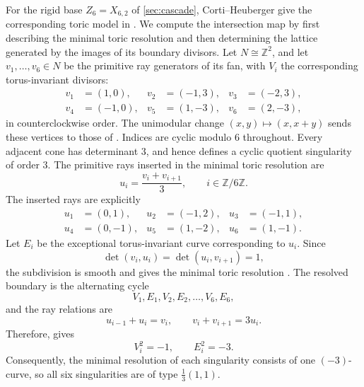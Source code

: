 \documentclass[11pt]{article}
\theoremstyle{plain}
\theoremstyle{definition}
\theoremstyle{remark}
\newcommand{\Z}{\mathbb Z}
\begin{document}
For the rigid base \(Z_6=X_{6,2}\) of \cref{sec:cascade},
Corti--Heuberger give the corresponding toric model in
\cite[Section~2.2.5]{Corti2016}. We compute the intersection map by first
describing the minimal toric resolution and then determining the lattice
generated by the images of its boundary divisors. Let \(N\cong\Z^2\), and let
\(v_1,\dots,v_6\in N\) be the primitive ray generators of its fan, with
\(V_i\) the corresponding torus-invariant divisors:
\[
\begin{aligned}
v_1&=(1,0),&
v_2&=(-1,3),&
v_3&=(-2,3),\\
v_4&=(-1,0),&
v_5&=(1,-3),&
v_6&=(2,-3),
\end{aligned}
\]
in counterclockwise order. The unimodular change
\((x,y)\mapsto(x,x+y)\) sends these vertices to those of
\cite[Figure~1]{Corti2016}. Indices are cyclic modulo \(6\) throughout. Every
adjacent cone has determinant \(3\), and hence defines a cyclic quotient
singularity of order \(3\). The primitive rays inserted in the
minimal toric resolution are
\[
u_i=\frac{v_i+v_{i+1}}3,
\qquad
i\in\Z/6\Z.
\]
The inserted rays are explicitly
\[
\begin{aligned}
u_1&=(0,1),&
u_2&=(-1,2),&
u_3&=(-1,1),\\
u_4&=(0,-1),&
u_5&=(1,-2),&
u_6&=(1,-1).
\end{aligned}
\]
Let \(E_i\) be the exceptional torus-invariant curve corresponding to
\(u_i\). Since
\[
\det(v_i,u_i)=\det(u_i,v_{i+1})=1,
\]
the subdivision is smooth and gives the minimal toric resolution
\cite[Chapters~10--11]{CoxLittleSchenck2011}. The resolved boundary is the
alternating cycle
\[
V_1,E_1,V_2,E_2,\dots,V_6,E_6,
\]
and the ray relations are
\[
u_{i-1}+u_i=v_i,
\qquad
v_i+v_{i+1}=3u_i.
\]
Therefore, \cite[Theorem~10.4.4]{CoxLittleSchenck2011} gives
\[
V_i^2=-1,\qquad E_i^2=-3.
\]
Consequently, the minimal resolution of each singularity consists of one
\((-3)\)-curve, so all six singularities are of type \(\frac13(1,1)\).
\end{document}
